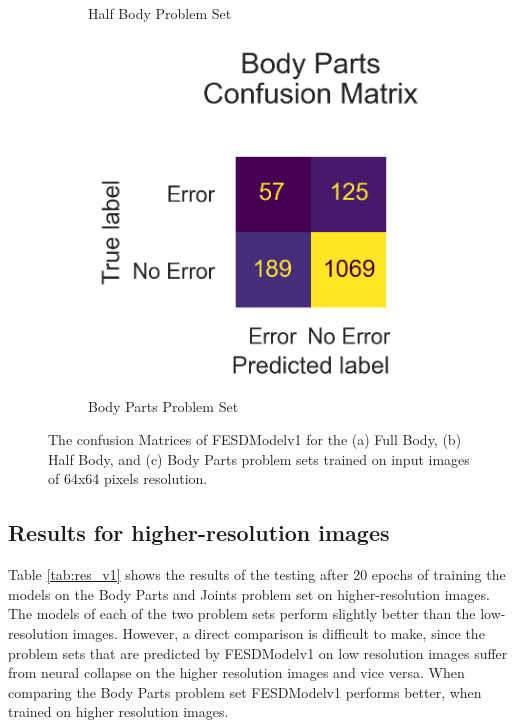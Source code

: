 \begin{figure}[!htbp]
\begin{subfigure}[b]{0.4\linewidth}
      \caption[]{Half Body Problem Set}
      \label{fig:hb_conf_v1}
  \end{subfigure}
  \hfill
  \begin{subfigure}[b]{0.4\linewidth}
      \centering
      \includegraphics[width=\textwidth]{figures/Results_lo/v1/confusion/body_parts_together.png}
      \caption[]{Body Parts Problem Set}
      \label{fig:bp_conf_v1}
  \end{subfigure}
  \hfill
  \caption[Confusion Matrices of FESDModelv1 (64x64 pixels input resolution)]{The confusion Matrices of FESDModelv1 for the (a) Full Body, (b) Half Body, and (c) Body Parts problem sets trained on input images of 64x64 pixels resolution.}
  \label{fig:conf_v1}
\end{figure}

\FloatBarrier

%
%
%
%
%
%
%
%
%
%
%
%
%
%
%

\subsection{Results for higher-resolution images}

Table \ref{tab:res_v1} shows the results of the testing after 20 epochs of training the models on the Body Parts and Joints problem set on higher-resolution images. The models of each of the two problem sets perform slightly better than the low-resolution images. However, a direct comparison is difficult to make, since the problem sets that are predicted by FESDModelv1 on low resolution images suffer from neural collapse on the higher resolution images and vice versa. When comparing the Body Parts problem set FESDModelv1 performs better, when trained on higher resolution images.

